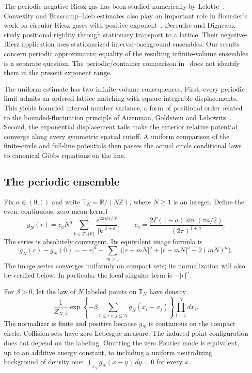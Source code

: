 \documentclass[11pt]{article}
\theoremstyle{remark}\newtheorem{remark}[theorem]{Remark}
\newcommand{\R}{\mathbb R}
\newcommand{\Z}{\mathbb Z}
\begin{document}
The periodic negative-Riesz gas has been studied numerically by
Lelotte~\cite{Lelotte}. Convexity and Brascamp--Lieb estimates also
play an important role in Boursier's work on circular Riesz gases
with positive exponent~\cite{Boursier}. Dereudre and
Digneaux~\cite{DD} study positional rigidity through stationary
transport to a lattice. Their negative-Riesz application uses
stationarized interval-background ensembles. Our results concern
periodic approximants; equality of the resulting infinite-volume
ensembles is a separate question. The periodic/container comparison
in~\cite{Lewin} does not identify them in the present exponent range.

The uniform estimate has two infinite-volume consequences. First,
every periodic limit admits an ordered lattice matching with square
integrable displacements. This yields bounded interval number
variance, a form of positional order related to the bounded-fluctuation
principle of Aizenman, Goldstein and Lebowitz~\cite{AGL}.
Second, the exponential displacement tails make the exterior
relative potential converge along every symmetric spatial cutoff.
A uniform comparison of the finite-circle and full-line potentials
then passes the actual circle conditional laws to canonical Gibbs
equations on the line.

\subsection{The periodic ensemble}

Fix $a\in(0,1)$ and write $\mathbb T_N=\R/(N\Z)$, where
$N\ge1$ is an integer. Define the even, continuous, zero-mean kernel
\begin{equation}\label{eq:kernel}
 g_N(r)=c_aN^a\sum_{k\in\Z\setminus\{0\}}
                  \frac{e^{2\pi ikr/N}}{|k|^{1+a}},
 \qquad
 c_a=\frac{2\Gamma(1+a)\sin(\pi a/2)}{(2\pi)^{1+a}}.
\end{equation}
The series is absolutely convergent. Its equivalent image formula is
\begin{equation}\label{eq:images}
 g_N(r)-g_N(0)=-|r|^a-
  \sum_{m\ge1}
  \bigl(|r+mN|^a+|r-mN|^a-2(mN)^a\bigr).
\end{equation}
The image series converges uniformly on compact sets; its
normalization will also be verified below. In particular the local
singular term is $-|r|^a$.

For $\beta>0$, let the law of $N$ labeled points on $\mathbb T_N$
have density
\begin{equation}\label{eq:ensemble}
 \frac1{Z_{N,\beta}}
 \exp\left\{-\beta\sum_{1\le i<j\le N}g_N(x_i-x_j)\right\}
 \prod_{i=1}^N dx_i.
\end{equation}
The normalizer is finite and positive because $g_N$ is continuous
on the compact circle. Collision sets have zero Lebesgue measure.
The induced point configuration does not depend on the labeling.
Omitting the zero Fourier mode is equivalent, up to an additive
energy constant, to including a uniform neutralizing background of
density one: $\int_{\mathbb T_N}g_N(x-y)\,dy=0$ for every $x$.
\end{document}
